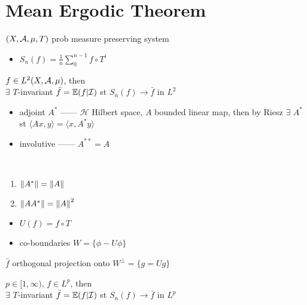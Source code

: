 \section{Mean Ergodic Theorem}\label{sec:mean-ergodic-theorem}

\begin{setting}
    $(X, \mathcal{A}, \mu, T)$ prob measure preserving system
\end{setting}

\begin{itemize}
    \item $S_n(f) = \frac{1}{n}\sum^{n-1}_0 f\circ T^i$
\end{itemize}

\begin{thm}
    $f \in L^2(X, \mathcal{A}, \mu)$, then\\
    $\exists$ $T$-invariant $\bar{f} = \mathbb{E}(f|\mathcal{I})$ st $S_n(f) \rightarrow \bar{f}$ in $L^2$
\end{thm}

\begin{itemize}
    \item adjoint $A^*$ ------ $\mathcal{H}$ Hilbert space, $A$ bounded linear map, then by Riesz $\exists$ $A^*$ st $\langle Ax, y \rangle = \langle x, A^{*}y \rangle$
    \item involutive ------ $A^{**} = A$
\end{itemize}

\begin{fact}\,
    \begin{enumerate}
        \item $\left\lVert A^*\right\rVert = \left\lVert A\right\rVert$
        \item $\left\lVert AA^*\right\rVert = \left\lVert A\right\rVert^2$
    \end{enumerate}
\end{fact}

\begin{itemize}
    \item $U(f) = f \circ T$
    \item co-boundaries $W = \{\phi - U\phi\}$
\end{itemize}

\begin{fact}
    $\bar{f}$ orthogonal projection onto $W^\perp = \{g = Ug\}$
\end{fact}

\begin{cor}
    $p \in [1, \infty)$, $f \in L^p$, then\\
    $\exists$ $T$-invariant $\bar{f} = \mathbb{E}(f|\mathcal{I})$ st $S_n(f) \rightarrow \bar{f}$ in $L^p$
\end{cor}

